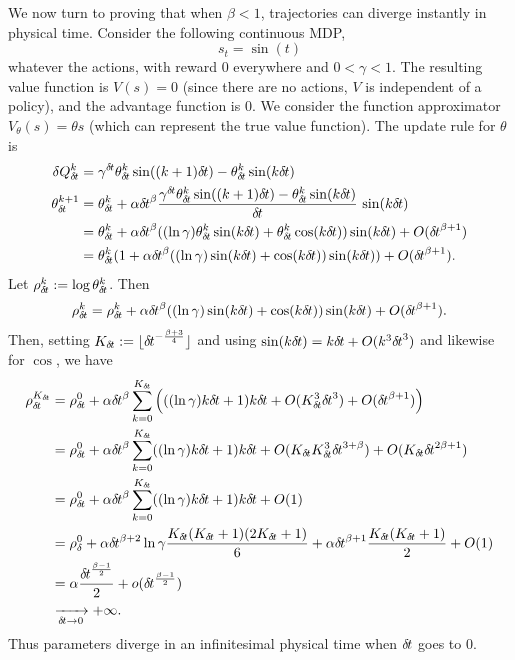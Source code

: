 We now turn to proving that when $\beta < 1$,
trajectories can diverge instantly in physical time. 
Consider the following continuous MDP, 
\begin{equation}
	s_t = \sin(t)
\end{equation}
whatever the actions,
with reward $0$ everywhere and $0 < \gamma < 1$.
The resulting value function is $V(s) = 0$ (since there
are no actions, $V$ is independent of a policy), and the advantage
function is $0$.
We consider the function approximator $V_\theta(s) = \theta s$ (which can
represent the true value function).
The update rule for $\theta$ is
\begin{align}
\delta Q_\deltat^k &= \gamma^\deltat \theta_\deltat^k \sin((k + 1)
\deltat) - \theta_\deltat^k \sin(k\deltat)\\
	\theta_\deltat^{k+1} &= \theta_\deltat^k + \alpha \deltat^\beta
	\frac{\gamma^\deltat \theta_\deltat^k \sin((k + 1) \deltat) -
	\theta_\deltat^k \sin(k\deltat)}{\deltat}\,\sin(k\deltat)\\
			     &= \theta_\deltat^k + \alpha \deltat^\beta
			     ((\ln \gamma) \theta_\deltat^k \sin(k \deltat)
			     + \theta_\deltat^k \cos(k
			     \deltat))\sin(k\deltat) + \bigO(\deltat^{\beta + 1})\\
			     &= \theta_\deltat^k(1 + \alpha \deltat^\beta
			     ((\ln \gamma) \sin(k \deltat) + \cos(k
			     \deltat))\sin(k\deltat)) + \bigO(\deltat^{\beta + 1}).
\end{align}
Let $\rho_{\delta\hspace{-.1em}t}^k \mathrel{\mathop{:}}= \log \theta_{\delta\hspace{-.1em}t}^k$. Then
\begin{align}
	\rho_{\delta\hspace{-.1em}t}^k = \rho_{\delta\hspace{-.1em}t}^k + \alpha {\delta\hspace{-.1em}t}^\beta ((\ln
	\gamma) \sin(k {\delta\hspace{-.1em}t}) + \cos(k {\delta\hspace{-.1em}t}))\sin(k{\delta\hspace{-.1em}t}) +
	O({\delta\hspace{-.1em}t}^{\beta+1}).
\end{align}
Then, setting $K_{\delta\hspace{-.1em}t} \mathrel{\mathop{:}}= \lfloor {\delta\hspace{-.1em}t}^{-\frac{\beta +
3}{4}}\rfloor$ and using $\sin(k{\delta\hspace{-.1em}t})=k{\delta\hspace{-.1em}t}+O(k^3{\delta\hspace{-.1em}t}^3)$ and
likewise for $\cos$, we have
\begin{align}
	\rho_\deltat^{K_\deltat} &= \rho_\deltat^0 + \alpha \deltat^\beta
	\sum\limits_{k=0}^{K_\deltat} \left(((\ln \gamma)k\deltat +
	1)k\deltat + \bigO(K_\deltat^3 \deltat^{3}) +
	\bigO(\deltat^{\beta+1})\right)\\
	&= \rho_\deltat^0 + \alpha \deltat^\beta
	\sum\limits_{k=0}^{K_\deltat} ((\ln \gamma) k\deltat +
	1)k\deltat + \bigO(K_\deltat K_\deltat^3 \deltat^{3 + \beta}) +
	\bigO(K_\deltat \deltat^{2\beta+1})\\
				 &= \rho_\deltat^0 + \alpha \deltat^\beta
				 \sum\limits_{k=0}^{K_\deltat} ((\ln
				 \gamma) k\deltat + 1)k\deltat +
				 \bigO(1)\\
				 &= \rho_\delta^0 + \alpha\deltat^{\beta
				 + 2} \ln\gamma \frac{K_\deltat
				 (K_\deltat + 1) (2 K_\deltat + 1)}{6} +
				 \alpha \deltat^{\beta + 1}
				 \frac{K_\deltat (K_\deltat + 1)}{2} +
				 O(1)\\
				 &= \alpha \frac{\deltat^{\frac{\beta - 1}{2}}}{2} + \smallo(\deltat^{\frac{\beta - 1}{2}})\\
				 &\xrightarrow[\deltat\to 0]{} +\infty.
\end{align}
Thus parameters diverge in an infinitesimal physical time when ${\delta\hspace{-.1em}t}$ goes to $0$.

